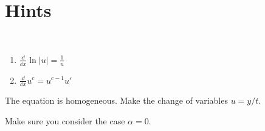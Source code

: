 {\begin{Exercise}
\end{Exercise}



































\raggedbottom
}
\pagebreak
\flushbottom
\section{Hints}



\begin{Hint}
  \label{hint gygyf}
  $\phantom{a}$

  \begin{enumerate}
  \item $\frac{\dd}{\dd x} \ln |u| = \frac{1}{u}$
  \item $\frac{\dd}{\dd x} u^c = u^{c-1} u'$
  \end{enumerate}
\end{Hint}






\begin{Hint}
  \label{hint integrating factor homogeneous}
\end{Hint}





\begin{Hint}
  \label{hint dydt = f(y/t)}
  The equation is homogeneous.  Make the change of variables $u = y / t$.
\end{Hint}




\begin{Hint}
  \label{hint y - 1/x y = x alpha}
  Make sure you consider the case $\alpha = 0$.
\end{Hint}




